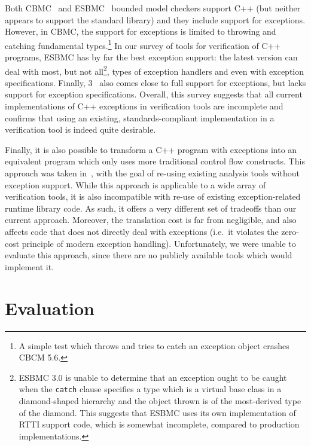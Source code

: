 Both CBMC~\cite{clarke04:tool.checkin, kroening14:cbmc} and
ESBMC~\cite{ramalho13:smt.based} bounded model checkers support C++
(but neither appears to support the standard library) and they include
support for exceptions. However, in CBMC, the support for exceptions is
limited to throwing and catching fundamental types.\footnote{A simple
  test which throws and tries to catch an exception object crashes CBCM
  5.6.} In our survey of tools for verification of C++ programs, ESBMC
has by far the best exception support: the latest version can deal with
most, but not all\footnote{ESBMC 3.0 is unable to determine that an
  exception ought to be caught when the \texttt{catch} clause specifies
  a type which is a virtual base class in a diamond-shaped hierarchy and
  the object thrown is of the most-derived type of the diamond. This
  suggests that ESBMC uses its own implementation of RTTI support code,
  which is somewhat incomplete, compared to production implementations.},
types of exception handlers and even with exception specifications.
Finally, \divine{} 3~\cite{rockai16:model.checkin} also comes close to
full support for exceptions, but lacks support for exception
specifications. Overall, this survey suggests that all current
implementations of C++ exceptions in verification tools are incomplete
and confirms that using an existing, standards-compliant implementation
in a verification tool is indeed quite desirable.

Finally, it is also possible to transform a C++ program with exceptions
into an equivalent program which only uses more traditional control flow
constructs. This approach was taken in~\cite{prabhu11:interp.except},
with the goal of re-using existing analysis tools without exception
support. While this approach is applicable to a wide array of
verification tools, it is also incompatible with re-use of existing
exception-related runtime library code. As such, it offers a very
different set of tradeoffs than our current approach. Moreover, the
translation cost is far from negligible, and also affects code that does
not directly deal with exceptions (i.e.~it violates the zero-cost
principle of modern exception handling). Unfortunately, we were unable
to evaluate this approach, since there are no publicly available tools
which would implement it.

\section{Evaluation}\label{sec:evaluation}


